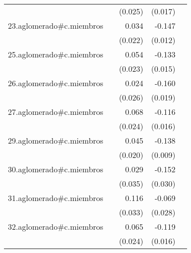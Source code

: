 {\begin{longtable}{l*{4}{D{.}{.}{-1}}}
            &                     &     (0.025)         &     (0.017)         &                     \\
\addlinespace
23.aglomerado#c.miembros&                     &       0.034         &      -0.147\sym{***}&                     \\
            &                     &     (0.022)         &     (0.012)         &                     \\
\addlinespace
25.aglomerado#c.miembros&                     &       0.054\sym{*}  &      -0.133\sym{***}&                     \\
            &                     &     (0.023)         &     (0.015)         &                     \\
\addlinespace
26.aglomerado#c.miembros&                     &       0.024         &      -0.160\sym{***}&                     \\
            &                     &     (0.026)         &     (0.019)         &                     \\
\addlinespace
27.aglomerado#c.miembros&                     &       0.068\sym{**} &      -0.116\sym{***}&                     \\
            &                     &     (0.024)         &     (0.016)         &                     \\
\addlinespace
29.aglomerado#c.miembros&                     &       0.045\sym{*}  &      -0.138\sym{***}&                     \\
            &                     &     (0.020)         &     (0.009)         &                     \\
\addlinespace
30.aglomerado#c.miembros&                     &       0.029         &      -0.152\sym{***}&                     \\
            &                     &     (0.035)         &     (0.030)         &                     \\
\addlinespace
31.aglomerado#c.miembros&                     &       0.116\sym{***}&      -0.069\sym{*}  &                     \\
            &                     &     (0.033)         &     (0.028)         &                     \\
\addlinespace
32.aglomerado#c.miembros&                     &       0.065\sym{**} &      -0.119\sym{***}&                     \\
            &                     &     (0.024)         &     (0.016)         &                     \\

\end{longtable}}
